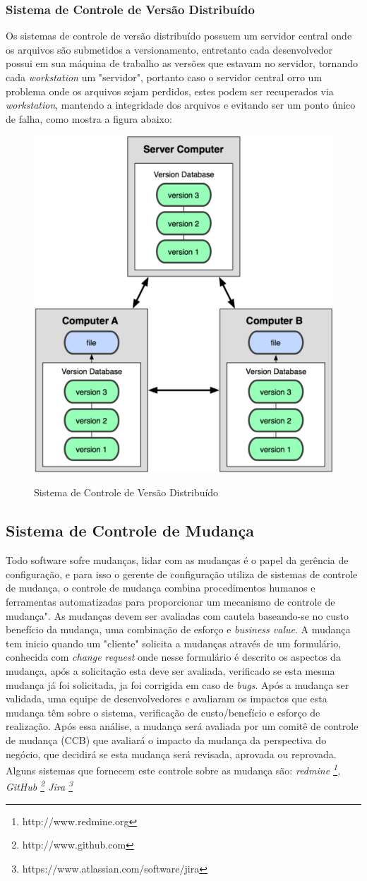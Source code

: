 \subsubsection{Sistema de Controle de Versão Distribuído}Os sistemas de controle de versão distribuído possuem um servidor central onde os arquivos são submetidos a versionamento, entretanto cada desenvolvedor possui em sua máquina de trabalho as versões que estavam no servidor, tornando cada \textit{workstation} um "servidor", portanto caso o servidor central orro um problema onde os arquivos sejam perdidos, estes podem ser recuperados via \textit{workstation}, mantendo a integridade dos arquivos e evitando ser um ponto único de falha, como mostra a figura abaixo:
\begin{figure}[tbh]
\centering
\caption[Sistema de Controle de Versão Distribuído]{Sistema de Controle de Versão Distribuído}
\includegraphics[width=0.4\linewidth]{./images/scvdist}
\label{fig:SCVDistribuido}
\end{figure}
\subsection{Sistema de Controle de Mudança}
Todo software sofre mudanças, lidar com as mudanças é o papel da gerência de configuração, e para isso o gerente de configuração utiliza de sistemas de controle de mudança, o controle de mudança combina procedimentos humanos e ferramentas automatizadas para proporcionar um mecanismo de controle de mudança".  As mudanças devem ser avaliadas com cautela baseando-se no custo benefício da mudança, uma combinação de esforço e \textit{business value}. A mudança tem inicio quando um "cliente" solicita a mudanças através de um formulário, conhecida com \textit{change request} onde nesse formulário é descrito os aspectos da mudança, após a solicitação esta deve ser avaliada, verificado se esta mesma mudança já foi solicitada, ja foi corrigida em caso de \textit{bugs}. Após a mudança ser validada, uma equipe de desenvolvedores e avaliaram os impactos que esta mudança têm sobre o sistema, verificação de custo/benefício e esforço de realização. \cite{sommerville2011} Após essa análise, a mudança será avaliada por um comitê de controle de mudança (CCB) que avaliará o impacto da mudança da perspectiva do negócio, que decidirá se esta mudança será revisada, aprovada ou reprovada. Alguns sistemas que fornecem este controle sobre as mudança são: \textit{redmine \footnote{http://www.redmine.org}, GitHub \footnote{http://www.github.com} Jira \footnote{https://www.atlassian.com/software/jira}}
